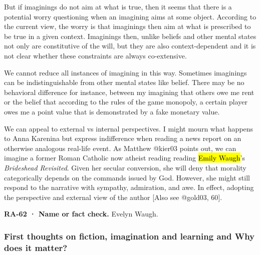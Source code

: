 \documentclass[
  letterpaper,
  DIV=11,
  numbers=noendperiod]{scrartcl}
\theoremstyle{remark}
\begin{document}
But if imaginings do not aim at what is true, then it seems that there
is a potential worry questioning when an imagining aims at some object.
According to the current view, the worry is that imaginings then aim at
what is prescribed to be true in a given context. Imaginings then,
unlike beliefs and other mental states not only are constitutive of the
will, but they are also context-dependent and it is not clear whether
these constraints are always co-extensive.

We cannot reduce all instances of imagining in this way. Sometimes
imaginings can be indistinguishable from other mental states like
belief. There may be no behavioral difference for instance, between my
imagining that others owe me rent or the belief that according to the
rules of the game monopoly, a certain player owes me a point value that
is demonstrated by a fake monetary value.

We can appeal to external vs internal perspectives. I might mourn what
happens to Anna Karenina but express indifference when reading a news
report on an otherwise analogous real-life event. As Matthew @kier03
points out, we can imagine a former Roman Catholic now atheist reading
reading \hl{Emily Waugh}'s \emph{Brideshead Revisited}. Given her
secular conversion, she will deny that morality categorically depends on
the commands issued by God. However, she might still respond to the
narrative with sympathy, admiration, and awe. In effect, adopting the
perspective and external view of the author {[}Also see @gold03, 60{]}.

\begin{tcolorbox}[enhanced jigsaw, arc=.35mm, bottomrule=.15mm, bottomtitle=1mm, breakable, colback=white, colbacktitle=quarto-callout-caution-color!10!white, colframe=quarto-callout-caution-color-frame, coltitle=black, left=2mm, leftrule=.75mm, opacityback=0, opacitybacktitle=0.6, rightrule=.15mm, title=\textcolor{quarto-callout-caution-color}{\faFire}\hspace{0.5em}{Caution}, titlerule=0mm, toprule=.15mm, toptitle=1mm]

\textbf{RA-62 · Name or fact check.} Evelyn Waugh.

\end{tcolorbox}

\subsubsection*{First thoughts on fiction, imagination and learning and
Why does it
matter?}\label{first-thoughts-on-fiction-imagination-and-learning-and-why-does-it-matter}
\end{document}
